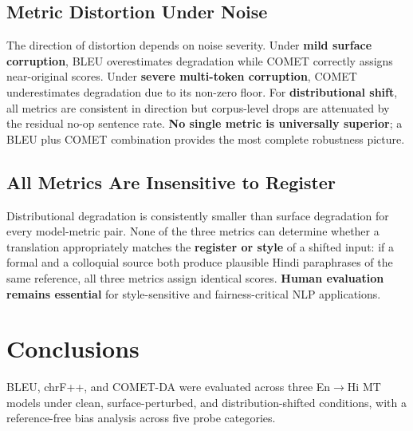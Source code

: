 \documentclass[11pt,a4paper]{article}
\begin{document}
\subsection{Metric Distortion Under Noise}

The direction of distortion depends on noise severity. Under \textbf{mild
surface corruption}, BLEU overestimates degradation while COMET correctly
assigns near-original scores. Under \textbf{severe multi-token corruption},
COMET underestimates degradation due to its non-zero floor. For
\textbf{distributional shift}, all metrics are consistent in direction but
corpus-level drops are attenuated by the residual no-op sentence rate.
\textbf{No single metric is universally superior}; a BLEU plus COMET
combination provides the most complete robustness picture.

\subsection{All Metrics Are Insensitive to Register}

Distributional degradation is consistently smaller than surface degradation
for every model-metric pair. None of the three metrics can determine whether a
translation appropriately matches the \textbf{register or style} of a shifted
input: if a formal and a colloquial source both produce plausible Hindi
paraphrases of the same reference, all three metrics assign identical scores.
\textbf{Human evaluation remains essential} for style-sensitive and
fairness-critical NLP applications.

\section{Conclusions}

BLEU, chrF++, and COMET-DA were evaluated across three En$\to$Hi MT models
under clean, surface-perturbed, and distribution-shifted conditions, with a
reference-free bias analysis across five probe categories.
\end{document}
